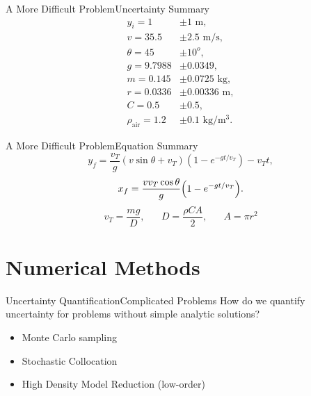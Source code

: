 \documentclass{beamer}
\begin{document}
\begin{frame}[label=unc_sum]{A More Difficult Problem}{Uncertainty Summary}\vspace{-30pt}
\begin{align*}
y_i=1&\pm1\text{ m},\\
v=35.5&\pm2.5\text{ m/s},\\
\theta=45&\pm10^o,\\
g=9.7988&\pm0.0349,\\
m=0.145&\pm0.0725\text{ kg},\\
r=0.0336&\pm0.00336\text{ m},\\
C=0.5&\pm0.5,\\
\rho_\text{air}=1.2&\pm0.1\text{ kg/m$^3$}.
\end{align*}
\begin{center}\hyperlink{sens_res}{}\end{center}
\end{frame}

\begin{frame}{A More Difficult Problem}{Equation Summary}
\begin{equation*}
y_f=\frac{v_T}{g}(v\sin\theta+v_T)\left(1-e^{-gt/v_T}\right)-v_Tt,
\end{equation*}\vspace{15pt}
\begin{equation*}
x_f=\frac{vv_T\cos\theta}{g}\qty(1-e^{-gt/v_T}).
\end{equation*}\vspace{15pt}
\begin{equation*}
v_T=\frac{mg}{D},\hspace{20pt}D=\frac{\rho C A}{2},\hspace{20pt}A=\pi r^2
\end{equation*}
\end{frame}

\section{Numerical Methods}
\begin{frame}{Uncertainty Quantification}{Complicated Problems}\vspace{-20pt}
How do we quantify uncertainty for problems without simple analytic solutions?\vspace{15pt}
\begin{itemize}
\item Monte Carlo sampling
\item Stochastic Collocation
\item High Density Model Reduction (low-order)
\end{itemize}
\end{frame}
\end{document}
